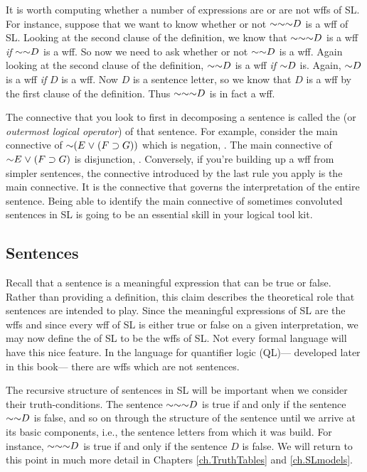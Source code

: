 It is worth computing whether a number of expressions are or are not wffs of SL.
For instance, suppose that we want to know whether or not $\enot \enot \enot D$ is a wff of SL.
Looking at the second clause of the definition, we know that $\enot \enot \enot D$ is a wff \emph{if} $\enot \enot D$ is a wff.
So now we need to ask whether or not $\enot \enot D$ is a wff.
Again looking at the second clause of the definition, $\enot \enot D$ is a wff \emph{if} $\enot D$ is.
Again, $\enot D$ is a wff \emph{if} $D$ is a wff.
Now $D$ is a sentence letter, so we know that $D$ is a wff by the first clause of the definition.
Thus $\enot \enot \enot D$ is in fact a wff. 

The connective that you look to first in decomposing a sentence is called the  (or \emph{outermost logical operator}) of that sentence.
For example, consider the main connective of $\enot (E \eor (F \eif G))$ which is negation, \enot.
The main connective of $\enot E \eor (F \eif G)$ is disjunction, \eor.
Conversely, if you're building up a wff from simpler sentences, the connective introduced by the last rule you apply is the main connective.
It is the connective that governs the interpretation of the entire sentence.
Being able to identify the main connective of sometimes convoluted sentences in SL is going to be an essential skill in your logical tool kit.





\subsection{Sentences}

Recall that a sentence is a meaningful expression that can be true or false.
Rather than providing a definition, this claim describes the theoretical role that sentences are intended to play.
Since the meaningful expressions of SL are the wffs and since every wff of SL is either true or false on a given interpretation, we may now define the  of SL to be the wffs of SL.
Not every formal language will have this nice feature.
In the language for quantifier logic (QL)--- developed later in this book--- there are wffs which are not sentences.

The recursive structure of sentences in SL will be important when we consider their truth-conditions.
The sentence $\enot \enot \enot D$ is true if and only if the sentence $\enot \enot D$ is false, and so on through the structure of the sentence until we arrive at its basic components, i.e., the sentence letters from which it was build.
For instance, $\enot \enot \enot D$ is true if and only if the sentence $D$ is false.
We will return to this point in much more detail in Chapters \ref{ch.TruthTables} and \ref{ch.SLmodels}.






